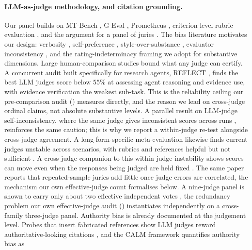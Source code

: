 \documentclass[11pt]{article}
\begin{document}
\paragraph{LLM-as-judge methodology, and citation grounding.} Our panel builds on
MT-Bench \citep{zheng2023mtbench}, G-Eval \citep{liu2023geval}, Prometheus
\citep{kim2024prometheus2}, criterion-level rubric evaluation
\citep{ye2024flask,kim2025biggenbench,arora2025healthbench}, and the argument for a
panel of juries \citep{verga2024poll}. The bias literature motivates our design: verbosity
\citep{saito2023verbosity,dubois2024alpacaeval}, self-preference
\citep{panickssery2024selfpreference,koo2024cobbler}, style-over-substance
\citep{wu2025style_over_substance}, evaluator inconsistency
\citep{stureborg2024inconsistent}, and the rating-indeterminacy framing
\citep{guerdan2025rating_indeterminacy} we adopt for substantive dimensions. Large
human-comparison studies \citep{bavaresco2025llms_vs_humans} bound what any judge can
certify. A concurrent audit built specifically for research agents, REFLECT
\citep{reflect2026}, finds the best LLM judges score below $55\%$ at assessing agent
reasoning and evidence use, with evidence verification the weakest sub-task. This is the
reliability ceiling our pre-comparison audit () measures directly,
and the reason we lead on cross-judge ordinal claims, not absolute substantive
levels. A parallel result on LLM-judge self-inconsistency, where the same judge gives
inconsistent scores across runs \citep{haldar2025ratingroulette}, reinforces the same
caution; this is why we report a within-judge re-test alongside cross-judge agreement.
A long-form-specific meta-evaluation likewise finds current judges unstable across
scenarios, with rubrics and references helpful but not sufficient
\citep{longjudgebench2026}. A cross-judge companion to this within-judge instability
shows scores can move even when the responses being judged are held fixed
\citep{yang2026judgeswap}. The same paper reports that
repeated-sample juries add little once judge errors are correlated, the mechanism our
own effective-judge count formalises below. A nine-judge panel is shown to carry only about two
effective independent votes \citep{kohli2026ninejudges}, the redundancy problem our own
effective-judge audit () instantiates independently on a cross-family
three-judge panel. Authority bias is already documented at the judgement level. Probes
that insert fabricated references show LLM judges reward authoritative-looking
citations \citep{chen2024fakeref}, and the CALM framework quantifies authority bias as
\end{document}
